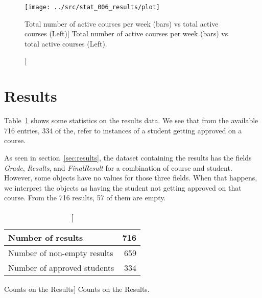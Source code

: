 \begin{figure}[h!]
    \centering

    \texttt{[image: ../src/stat\_006\_results/plot]}

    \caption
        [Total number of active courses per week (bars) vs total active courses (Left)]
        {Total number of active courses per week (bars) vs total active courses (Left).}

    \label{fig:stat_006}
\end{figure}

\section{Results}

Table~\ref{tab:results_stats} shows some statistics on the results data. We see
that from the available 716 entries, 334 of the, refer to instances of a
student getting approved on a course.

As seen in section~\ref{sec:results}, the dataset containing the results has
the fields \textit{Grade}, \textit{Results}, and \textit{FinalResult} for a
combination of course and student. However, some objects have no values for
those three fields. When that happens, we interpret the objects as having the
student not getting approved on that course. From the 716 results, 57 of them
are empty.

\begin{table}[h!]
    \centering

    \begin{tabular}{| l | r |}
        \hline
        Number of results           & 716 \\ \hline
        Number of non-empty results & 659  \\ \hline
        Number of approved students & 334 \\ \hline
    \end{tabular}

    \caption
        [Counts on the Results]
        {Counts on the Results.}

    \label{tab:results_stats}
\end{table}
